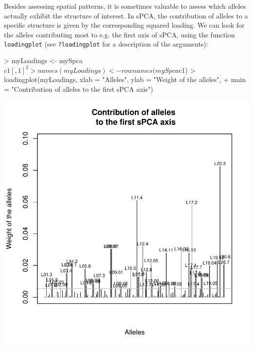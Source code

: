 \documentclass{article}
\begin{document}
Besides assessing spatial patterns, it is sometimes valuable to assess which alleles actually
exhibit the structure of interest.
In sPCA, the contribution of alleles to a specific structure is given by the corresponding squared loading.
We can look for the alleles contributing most to e.g. the first axis
of sPCA, using the function \texttt{loadingplot} (see \texttt{?loadingplot} for
a description of the arguments):
\begin{Schunk}
\begin{Sinput}
> myLoadings <- mySpca$c1[, 1]^2
> names(myLoadings) <- rownames(mySpca$c1)
> loadingplot(myLoadings, xlab = "Alleles", ylab = "Weight of the alleles", 
+     main = "Contribution of alleles \n to the first sPCA axis")
\end{Sinput}
\end{Schunk}
\includegraphics{figs/spca-024}
\end{document}
